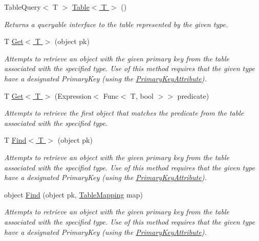 \begin{DoxyCompactItemize}
Table\-Query$<$ T $>$ \hyperlink{classSQLite_1_1SQLiteConnection_ab44d5100216c3cdcea76e45c6f7d6246}{Table$<$ T $>$} ()
\begin{DoxyCompactList}\small\item\em Returns a queryable interface to the table represented by the given type. \end{DoxyCompactList}\item 
T \hyperlink{classSQLite_1_1SQLiteConnection_a17fdec8364635853d573e84530e1ab48}{Get$<$ T $>$} (object pk)
\begin{DoxyCompactList}\small\item\em Attempts to retrieve an object with the given primary key from the table associated with the specified type. Use of this method requires that the given type have a designated Primary\-Key (using the \hyperlink{classSQLite_1_1PrimaryKeyAttribute}{Primary\-Key\-Attribute}). \end{DoxyCompactList}\item 
T \hyperlink{classSQLite_1_1SQLiteConnection_a4034d4b62385b2ab7451c5404ffb5efa}{Get$<$ T $>$} (Expression$<$ Func$<$ T, bool $>$$>$ predicate)
\begin{DoxyCompactList}\small\item\em Attempts to retrieve the first object that matches the predicate from the table associated with the specified type. \end{DoxyCompactList}\item 
T \hyperlink{classSQLite_1_1SQLiteConnection_adfe66fe8c304aca8575f07fc1c05d9f5}{Find$<$ T $>$} (object pk)
\begin{DoxyCompactList}\small\item\em Attempts to retrieve an object with the given primary key from the table associated with the specified type. Use of this method requires that the given type have a designated Primary\-Key (using the \hyperlink{classSQLite_1_1PrimaryKeyAttribute}{Primary\-Key\-Attribute}). \end{DoxyCompactList}\item 
object \hyperlink{classSQLite_1_1SQLiteConnection_a95729c5ebf5fad75631109db91e7c14b}{Find} (object pk, \hyperlink{classSQLite_1_1TableMapping}{Table\-Mapping} map)
\begin{DoxyCompactList}\small\item\em Attempts to retrieve an object with the given primary key from the table associated with the specified type. Use of this method requires that the given type have a designated Primary\-Key (using the \hyperlink{classSQLite_1_1PrimaryKeyAttribute}{Primary\-Key\-Attribute}). \end{DoxyCompactList}\item 
$$
\end{DoxyCompactItemize}
